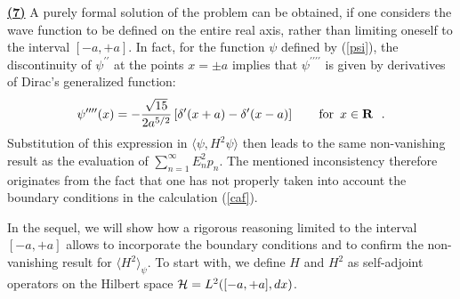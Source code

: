 \documentclass[a4wide,12pt]{report}
\begin{document}
\underline{{\bf (7)}}
A purely formal solution of the problem can be obtained,
if one considers the wave function to be defined 
on the entire real axis, rather than
limiting oneself to the interval $[-a, +a]$.
In fact, for the function $\psi$ defined by (\ref{psi}),
the discontinuity of 
$\psi^{\prime \prime}$ at the points $x = \pm a$ implies that 
$\psi^{\prime \prime \prime \prime}$ is given by derivatives 
of Dirac's generalized function: 
\[
\psi^{\prime \prime \prime \prime} (x) = -
{\sqrt{15} \over 2 a^{5/2}} \left[
\delta^{\prime} (x+a) - \delta^{\prime} (x-a) \right]
\qquad {\rm for} \ \, x \in {\bf R}
\ \ .
\]
Substitution of this expression in $\langle \psi , H^2 \psi \rangle$
then leads to the same non-vanishing result as the  
evaluation of $\sum_{n=1}^{\infty} E_n^2 p_n$.
The mentioned inconsistency therefore originates from the fact that 
one has not properly taken into account the boundary conditions 
in the calculation (\ref{caf}).

In the sequel, we will show 
how a rigorous reasoning limited to the interval 
$[-a , +a]$ allows to incorporate the boundary conditions 
and to confirm the non-vanishing result for 
$\langle H^2 \rangle_{\psi}$.
To start with, we define 
$H$ and $H^2$ as self-adjoint operators on the Hilbert space 
${\cal H} = L^2 ([-a,+a], dx)$.
 
\end{document}
